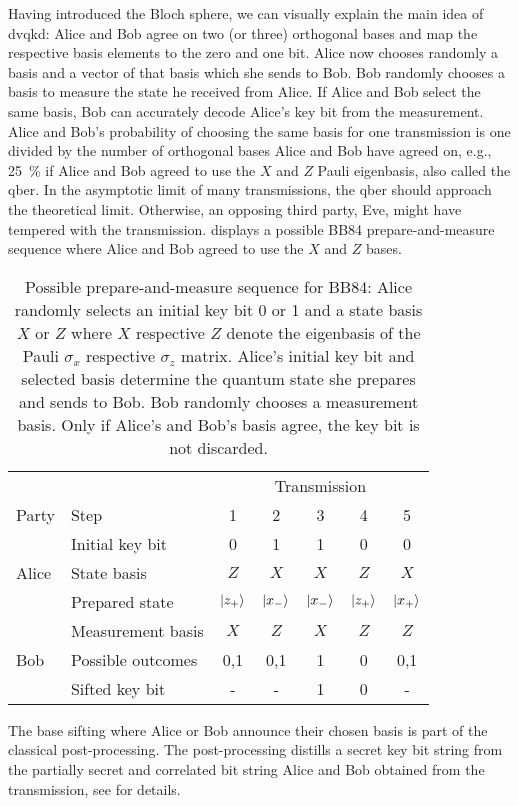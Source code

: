 Having introduced the Bloch sphere, we can visually explain the main idea of \gls{dvqkd}:
Alice and Bob agree on two (or three) orthogonal bases and map the respective basis elements to the zero and one bit.
Alice now chooses randomly a basis and a vector of that basis which she sends to Bob.
Bob randomly chooses a basis to measure the state he received from Alice.
If Alice and Bob select the same basis, Bob can accurately decode Alice's key bit from the measurement.
Alice and Bob's probability of choosing the same basis for one transmission is one divided by the number of orthogonal bases Alice and Bob have agreed on, e.g., \SI{25}{\percent} if Alice and Bob agreed to use the $X$ and $Z$ Pauli eigenbasis, also called the \gls{qber}.
In the asymptotic limit of many transmissions, the \gls{qber} should approach the theoretical limit.
Otherwise, an opposing third party, Eve, might have tempered with the transmission.
 displays a possible BB84 prepare-and-measure sequence where Alice and Bob agreed to use the $X$ and $Z$ bases.
\begin{table}[htb]
	\centering
	\begin{tabular}{llccccc}
		\toprule
		& & \multicolumn{5}{c}{Transmission} \\
		\cmidrule{3-7}
		Party & Step & 1 & 2 & 3 & 4 & 5 \\ 
		\midrule
		\multirow{3}{*}{Alice} & Initial key bit & \num{0} & \num{1} & \num{1} & \num{0} & \num{0} \\
		& State basis & $Z$ & $X$ & $X$ & $Z$ & $X$ \\
		& Prepared state & $\ket{z_+}$ & $\ket{x_-}$ & $\ket{x_-}$ & $\ket{z_+}$ & $\ket{x_+}$ \\
		\cmidrule{1-1}
		\multirow{3}{*}{Bob} & Measurement basis & $X$ & $Z$ & $X$ & $Z$ & $Z$ \\
		& Possible outcomes & \num{0},\num{1} & \num{0},\num{1} & \num{1} & \num{0} & \num{0},\num{1} \\
		& Sifted key bit & - & - & 1 & 0 & - \\
		\bottomrule
	\end{tabular}
	\caption{Possible prepare-and-measure sequence for BB84: Alice randomly selects an initial key bit \num{0} or \num{1} and a state basis $X$ or $Z$ where $X$ respective $Z$ denote the eigenbasis of the Pauli $\sigma_x$ respective $\sigma_z$ matrix. Alice's initial key bit and selected basis determine the quantum state she prepares and sends to Bob. Bob randomly chooses a measurement basis. Only if Alice's and Bob's basis agree, the key bit is not discarded.}\label{tab:dvqkd_transmission_sequence}
\end{table}
The base sifting where Alice or Bob announce their chosen basis is part of the classical post-processing.
The post-processing distills a secret key bit string from the partially secret and correlated bit string Alice and Bob obtained from the transmission, see  for details.

